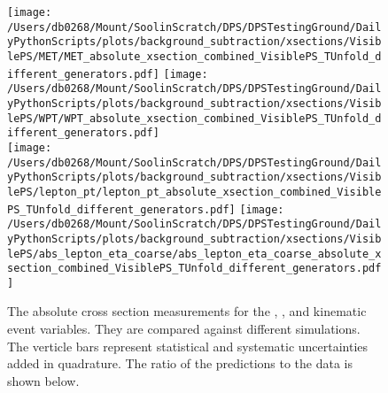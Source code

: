 \begin{figure}[hp]
	\centering
	\texttt{[image: /Users/db0268/Mount/SoolinScratch/DPS/DPSTestingGround/DailyPythonScripts/plots/background\_subtraction/xsections/VisiblePS/MET/MET\_absolute\_xsection\_combined\_VisiblePS\_TUnfold\_different\_generators.pdf]}
	\texttt{[image: /Users/db0268/Mount/SoolinScratch/DPS/DPSTestingGround/DailyPythonScripts/plots/background\_subtraction/xsections/VisiblePS/WPT/WPT\_absolute\_xsection\_combined\_VisiblePS\_TUnfold\_different\_generators.pdf]} \\
	\texttt{[image: /Users/db0268/Mount/SoolinScratch/DPS/DPSTestingGround/DailyPythonScripts/plots/background\_subtraction/xsections/VisiblePS/lepton\_pt/lepton\_pt\_absolute\_xsection\_combined\_VisiblePS\_TUnfold\_different\_generators.pdf]} 
	\texttt{[image: /Users/db0268/Mount/SoolinScratch/DPS/DPSTestingGround/DailyPythonScripts/plots/background\_subtraction/xsections/VisiblePS/abs\_lepton\_eta\_coarse/abs\_lepton\_eta\_coarse\_absolute\_xsection\_combined\_VisiblePS\_TUnfold\_different\_generators.pdf]}
 	\caption[The absolute cross section measurements for the \ptmiss{}, \WPT{}, \LPT{} and \LETA{} kinematic event variables. They are compared against different \ttbar{} simulations. The verticle bars represent statistical and systematic uncertainties added in quadrature. The ratio of the predictions to the data is shown below.]{The absolute cross section measurements for the \ptmiss{}, \WPT{}, \LPT{} and \LETA{} kinematic event variables. They are compared against different \ttbar{} simulations. The verticle bars represent statistical and systematic uncertainties added in quadrature. The ratio of the predictions to the data is shown below.}
	\label{fig:combXSecAbs2}
\end{figure}
